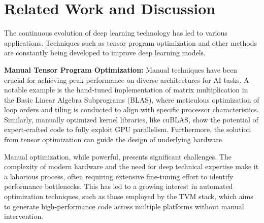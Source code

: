 \section{Related Work and Discussion}
The continuous evolution of deep learning technology has led to various applications\cite{wang2023prevent}\cite{voulodimos2018deep}. Techniques such as tensor program optimization and other methods\cite{dai2023sketch} are constantly being developed to improve deep learning models.

\textbf{Manual Tensor Program Optimization: }Manual techniques have been crucial for achieving peak performance on diverse architectures for AI tasks. A notable example is the hand-tuned implementation of matrix multiplication in the Basic Linear Algebra Subprograms (BLAS)\cite{blackford2002updated}, where meticulous optimization of loop orders and tiling is conducted to align with specific processor characteristics. Similarly, manually optimized kernel libraries, like cuBLAS, show the potential of expert-crafted code to fully exploit GPU parallelism. Furthermore, the solution from tensor optimization can guide the design of underlying hardware\cite{chang2023hdsuper}.


Manual optimization, while powerful, presents significant challenges. The complexity of modern hardware and the need for deep technical expertise make it a laborious process, often requiring extensive fine-tuning effort to identify performance bottlenecks. This has led to a growing interest in automated optimization techniques, such as those employed by the TVM stack, which aims to generate high-performance code across multiple platforms without manual intervention. 

